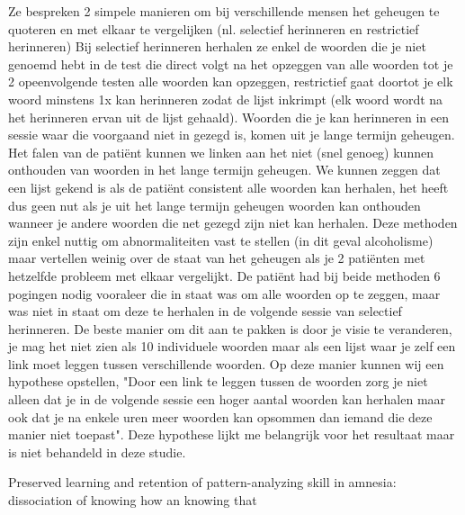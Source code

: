 \documentclass{voorstel}
\begin{document}
	Ze bespreken 2 simpele manieren om bij verschillende mensen het geheugen te quoteren en met
	elkaar te vergelijken (nl. selectief herinneren en restrictief herinneren)
	Bij selectief herinneren herhalen ze enkel de woorden die je niet genoemd hebt in de test die direct volgt na het
	opzeggen van alle woorden tot je 2 opeenvolgende testen alle woorden kan opzeggen, restrictief gaat doortot je elk woord minstens
	1x kan herinneren zodat de lijst inkrimpt (elk woord wordt na het herinneren ervan uit de lijst gehaald).
	Woorden die je kan herinneren in een sessie waar die voorgaand niet in gezegd is, komen uit je lange
	termijn geheugen. Het falen van de patiënt kunnen we linken aan het niet (snel genoeg) kunnen onthouden van woorden in het
	lange termijn geheugen. We kunnen zeggen dat een lijst gekend is als de patiënt consistent alle woorden kan herhalen, het heeft dus geen nut als
	je uit het lange termijn geheugen woorden kan onthouden wanneer je andere woorden die net gezegd zijn niet kan herhalen.
	Deze methoden zijn enkel nuttig om abnormaliteiten vast te stellen (in dit geval alcoholisme) maar vertellen weinig over de staat van het geheugen
	als je 2 patiënten met hetzelfde probleem met elkaar vergelijkt. De patiënt had bij beide methoden 6 pogingen nodig vooraleer die in staat was om alle woorden
	op te zeggen, maar was niet in staat om deze te herhalen in de volgende sessie van selectief herinneren. De beste manier om dit aan te pakken is door je visie te 
	veranderen, je mag het niet zien als 10 individuele woorden maar als een lijst waar je zelf een link moet leggen tussen verschillende woorden. Op deze manier kunnen wij
	een hypothese opstellen, "Door een link te leggen tussen de woorden zorg je niet alleen dat je in de volgende sessie een hoger aantal woorden kan herhalen maar ook 
	dat je na enkele uren meer woorden kan opsommen dan iemand die deze manier niet toepast". Deze hypothese lijkt me belangrijk voor het resultaat maar is niet behandeld in deze studie.
	

	Preserved learning and retention of pattern-analyzing skill in amnesia: dissociation of knowing how an knowing that \autocite{CohenSquire1980}
	
\end{document}
